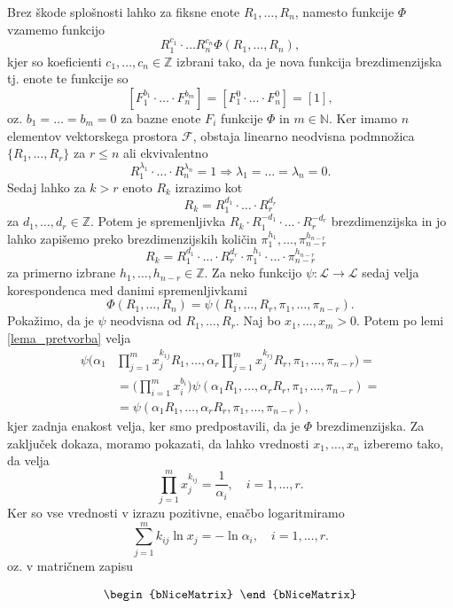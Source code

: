 \documentclass[mat2, tisk]{fmfdelo}
\newcommand{\N}{\mathbb N}
\newcommand{\Z}{\mathbb Z}
\begin{document}
\begin{dokaz}
Brez škode splošnosti lahko za fiksne enote $R_1, \dots, R_n$, namesto funkcije $\Phi$ vzamemo funkcijo 
$$
R_1^{c_1} \cdot \ldots R_n^{c_n} \Phi(R_1, \dots, R_n),
$$
kjer so koeficienti $c_1, \dots, c_n \in \Z$ izbrani tako, da je 
nova funkcija brezdimenzijska tj. enote te funkcije so 
$$
[F_1^{b_1} \cdot \ldots \cdot F_n^{b_m}] = [F_1^0 \cdot \ldots \cdot F_n^{0}] = [1],
$$
oz. $b_1 = \dots = b_m = 0$ za bazne enote $F_i$ funkcije $\Phi$ in $m\in \N$.
Ker imamo $n$ elementov vektorskega prostora $\mathcal{F}$, obstaja 
linearno neodvisna podmnožica $\{R_1, \dots, R_r\}$ za $r \leq n$ ali 
ekvivalentno 
$$
R_1^{\lambda_1} \cdot \ldots \cdot R_n^{\lambda_n} = 1 \Longrightarrow \lambda_1 = \dots = \lambda_n = 0.
$$
Sedaj lahko za $k > r$ enoto $R_k$ izrazimo kot 
$$
R_k = R_1^{d_1}\cdot \ldots \cdot R_r^{d_r}
$$
za $d_1, \dots, d_r \in \Z$. Potem je spremenljivka 
$R_k \cdot R_1^{-d_1}\cdot \ldots \cdot R_r^{-d_r}$ brezdimenzijska 
in jo lahko zapišemo preko brezdimenzijskih količin $\pi_1^{h_1}, \dots, \pi_{n-r}^{h_{n-r}}$
$$
R_k = R_1^{d_1}\cdot \ldots \cdot R_r^{d_r} \cdot \pi_1^{h_1} \cdot \ldots \cdot \pi_{n-r}^{h_{n-r}}
$$
za primerno izbrane $h_1, \dots, h_{n-r} \in \Z$. Za neko funkcijo
$\psi: \mathcal{L} \rightarrow \mathcal{L}$ sedaj velja korespondenca med 
danimi spremenljivkami 
$$
\Phi(R_1, \dots, R_n) = \psi(R_1, \dots, R_r, \pi_1, \dots, \pi_{n-r}).
$$
Pokažimo, da je $\psi$ neodvisna od $R_1, \dots, R_r$. Naj bo 
$x_1, \dots, x_m > 0$. Potem po lemi \ref{lema_pretvorba} velja 
\begin{align*}
\psi\Big(\alpha_1 &\prod_{j=1}^m x_j^{k_{1j}} R_1, \dots, \alpha_r \prod_{j=1}^m x_j^{k_{rj}} R_r, \pi_1, \dots, \pi_{n-r}\Big) = \\
&= \Big(\prod_{i=1}^m x_i^{b_i}\Big) \psi(\alpha_1 R_1, \dots, \alpha_r R_r, \pi_1, \dots, \pi_{n-r}) = \\
&= \psi(\alpha_1 R_1, \dots, \alpha_r R_r, \pi_1, \dots, \pi_{n-r}),
\end{align*}
kjer zadnja enakost velja, ker smo predpostavili, da je $\Phi$ brezdimenzijska.
Za zaključek dokaza, moramo pokazati, da lahko vrednosti $x_1, \dots, x_n$
izberemo tako, da velja 
$$
\prod_{j=1}^m x_j^{k_{ij}} = \frac{1}{\alpha_i}, \quad i = 1, \dots, r.
$$
Ker so vse vrednosti v izrazu pozitivne, enačbo logaritmiramo 
$$
\sum_{j=1}^m k_{ij} \ln{x_j} = - \ln{\alpha_i},  \quad i = 1, \dots, r.
$$
oz. v matričnem zapisu 
\begin{NiceMatrixBlock}
\[
\begin{bNiceMatrix}

\end{bNiceMatrix}\]
\end{NiceMatrixBlock}
\end{dokaz}
\end{document}
